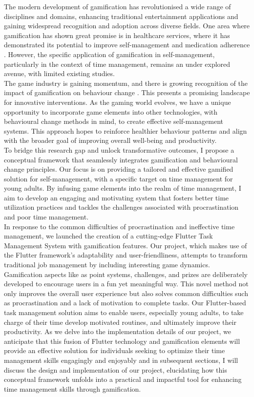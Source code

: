 \documentclass{l4proj}
\begin{document}
The modern development of gamification has revolutionised a wide range of disciplines and domains, enhancing traditional entertainment applications and gaining widespread recognition and adoption across diverse fields. One area where gamification has shown great promise is in healthcare services, where it has demonstrated its potential to improve self-management and medication adherence \cite{al2022gaming}. However, the specific application of gamification in self-management, particularly in the context of time management, remains an under explored avenue, with limited existing studies.
\\
The game industry is gaining momentum, and there is growing recognition of the impact of gamification on behaviour change \cite{kim2021effects}. This presents a promising landscape for innovative interventions. As the gaming world evolves, we have a unique opportunity to incorporate game elements into other technologies, with behavioural change methods in mind, to create effective self-management systems. This approach hopes to reinforce healthier behaviour patterns and align with the broader goal of improving overall well-being and productivity.
\\
To bridge this research gap and unlock transformative outcomes, I propose a conceptual framework that seamlessly integrates gamification and behavioural change principles. Our focus is on providing a tailored and effective gamified solution for self-management, with a specific target on time management for young adults. By infusing game elements into the realm of time management, I aim to develop an engaging and motivating system that fosters better time utilization practices and tackles the challenges associated with procrastination and poor time management.
\\

In response to the common difficulties of procrastination and ineffective time management, we launched the creation of a cutting-edge Flutter Task Management System with gamification features. Our project, which makes use of the Flutter framework's adaptability and user-friendliness, attempts to transform traditional job management by including interesting game dynamics. Gamification aspects like as point systems, challenges, and prizes are deliberately developed to encourage users in a fun yet meaningful way. This novel method not only improves the overall user experience but also solves common difficulties such as procrastination and a lack of motivation to complete tasks. Our Flutter-based task management solution aims to enable users, especially young adults, to take charge of their time develop motivated routines, and ultimately improve their productivity. As we delve into the implementation details of our project, we anticipate that this fusion of Flutter technology and gamification elements will provide an effective solution for individuals seeking to optimize their time management skills engagingly and enjoyably and in subsequent sections, I will discuss the design and implementation of our project, elucidating how this conceptual framework unfolds into a practical and impactful tool for enhancing time management skills through gamification.
\end{document}
